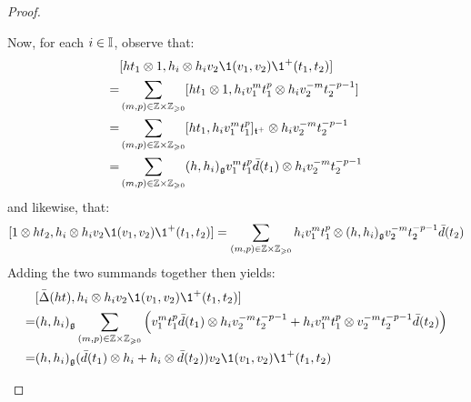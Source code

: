 \begin{proof}
\begin{enumerate}
\begin{enumerate}
                        Now, for each $i \in \mathbb{I}$, observe that:
                            $$
                                \begin{aligned}
                                    & [h t_1 \tensor 1, h_i \tensor h_i v_2\1(v_1, v_2) \1^+(t_1, t_2)]
                                    \\
                                    = & \sum_{(m, p) \in \Z \x \Z_{\geq 0}} [ht_1 \tensor 1, h_i v_1^m t_1^p \tensor h_i v_2^{-m} t_2^{-p - 1}]
                                    \\
                                    = & \sum_{(m, p) \in \Z \x \Z_{\geq 0}} [ht_1, h_i v_1^m t_1^p]_{\toroidal^{\positive}} \tensor h_i v_2^{-m} t_2^{-p - 1}
                                    \\
                                    = & \sum_{(m, p) \in \Z \x \Z_{\geq 0}} (h, h_i)_{\g} v_1^m t_1^p \bar{d}(t_1) \tensor h_i v_2^{-m} t_2^{-p - 1}
                                \end{aligned}
                            $$
                        and likewise, that:
                            $$[1 \tensor h t_2, h_i \tensor h_i v_2\1(v_1, v_2) \1^+(t_1, t_2)] = \sum_{(m, p) \in \Z \x \Z_{\geq 0}} h_i v_1^m t_1^p \tensor (h, h_i)_{\g} v_2^{-m} t_2^{-p - 1} \bar{d}(t_2)$$
                        Adding the two summands together then yields:
                            $$
                                \begin{aligned}
                                    & [\bar{\Delta}(ht), h_i \tensor h_i v_2\1(v_1, v_2) \1^+(t_1, t_2)]
                                    \\
                                    = & (h, h_i)_{\g} \sum_{(m, p) \in \Z \x \Z_{\geq 0}} \left( v_1^m t_1^p \bar{d}(t_1) \tensor h_i v_2^{-m} t_2^{-p - 1} + h_i v_1^m t_1^p \tensor v_2^{-m} t_2^{-p - 1} \bar{d}(t_2) \right)
                                    \\
                                    = & (h, h_i)_{\g} ( \bar{d}(t_1) \tensor h_i + h_i \tensor \bar{d}(t_2) ) v_2\1(v_1, v_2) \1^+(t_1, t_2)
                                \end{aligned}
                            $$
                        

\end{enumerate}
\end{enumerate}
\end{proof}
